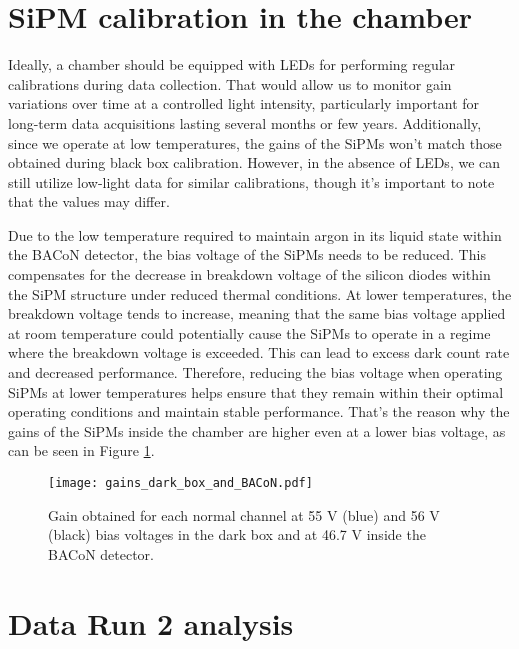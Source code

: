 \documentclass[11pt,a4paper,english,oneside, pdf]{article}
\begin{document}
	\section{SiPM calibration in the chamber}
	
	Ideally, a chamber should be equipped with LEDs for performing regular calibrations during data collection. That would allow us to monitor gain variations over time at a controlled light intensity, particularly important for long-term data acquisitions lasting several months or few years. Additionally, since we operate at low temperatures, the gains of the SiPMs won't match those obtained during black box calibration. However, in the absence of LEDs, we can still utilize low-light data for similar calibrations, though it's important to note that the values may differ.
	
	Due to the low temperature required to maintain argon in its liquid state within the BACoN detector, the bias voltage of the SiPMs needs to be reduced. This compensates for the decrease in breakdown voltage of the silicon diodes within the SiPM structure under reduced thermal conditions. At lower temperatures, the breakdown voltage tends to increase, meaning that the same bias voltage applied at room temperature could potentially cause the SiPMs to operate in a regime where the breakdown voltage is exceeded. This can lead to excess dark count rate and decreased performance. Therefore, reducing the bias voltage when operating SiPMs at lower temperatures helps ensure that they remain within their optimal operating conditions and maintain stable performance. That's the reason why the gains of the SiPMs inside the chamber are higher even at a lower bias voltage, as can be seen in Figure \ref{fig:gains_dark_box_and_BACoN}.
	
	\begin{figure}[!h]
		\begin{center}
			\texttt{[image: gains\_dark\_box\_and\_BACoN.pdf]}
			\caption{Gain obtained for each normal channel at 55 V (blue) and 56 V (black) bias voltages in the dark box and at 46.7 V inside the BACoN detector.}
			\label{fig:gains_dark_box_and_BACoN}
		\end{center}
	\end{figure}
	
	
	\section{Data Run 2 analysis}
	
\end{document}
